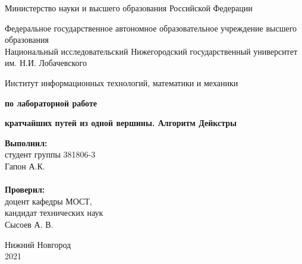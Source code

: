 \documentclass{report}
\begin{document}
\begin{titlepage}

\begin{center}
Министерство науки и высшего образования Российской Федерации
\end{center}

\begin{center}
Федеральное государственное автономное образовательное учреждение высшего образования \\
Национальный исследовательский Нижегородский государственный университет им. Н.И. Лобачевского
\end{center}

\begin{center}
Институт информационных технологий, математики и механики
\end{center}

\vspace{4em}

\begin{center}
\textbf{ по лабораторной работе} \\
\end{center}
\begin{center}
\textbf{ кратчайших путей из одной вершины. Алгоритм Дейкстры} \\
\end{center}

\vspace{4em}

\newbox{\lbox}
\newlength{\maxl}
\setlength{\maxl}{\wd\lbox}
\hfill\parbox{7cm}{
\hspace*{5cm}\hspace*{-5cm}\textbf{Выполнил:} \\ студент группы 381806-3 \\ Гапон А.К.\\
\\
\hspace*{5cm}\hspace*{-5cm}\textbf{Проверил:}\\ доцент кафедры МОСТ, \\ кандидат технических наук \\ Сысоев А. В.
}

\vspace{\fill}

\begin{center} Нижний Новгород \\ 2021 \end{center}

\end{titlepage}
\end{document}
